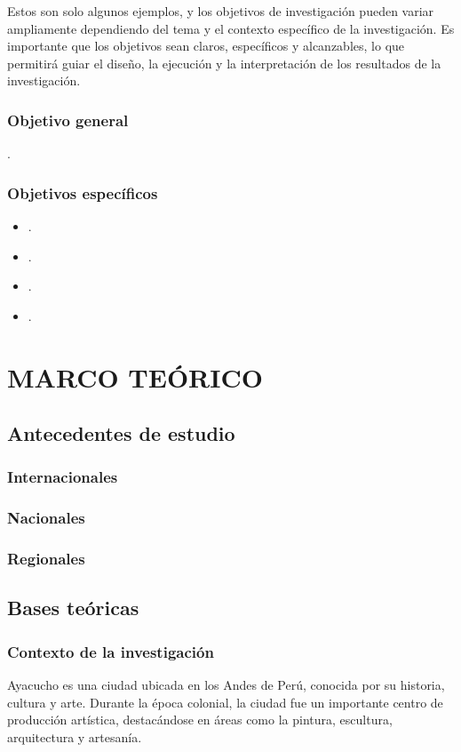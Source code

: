 \documentclass[12pt,a4paper]{article}
\begin{document}
Estos son solo algunos ejemplos, y los objetivos de investigación pueden variar ampliamente dependiendo del tema y el contexto específico de la investigación. Es importante que los objetivos sean claros, específicos y alcanzables, lo que permitirá guiar el diseño, la ejecución y la interpretación de los resultados de la investigación. 

\subsubsection{Objetivo general}
\objetivo.
\subsubsection{Objetivos específicos}
\begin{itemize}
	\item \objetivoe.
	\item \objetivoee.
	\item \objetivoeee.
	\item \objetivoeeee.
\end{itemize}


\section{MARCO TEÓRICO}

\subsection{Antecedentes de estudio}
\subsubsection{Internacionales}
\subsubsection{Nacionales}
\subsubsection{Regionales}

\subsection{Bases teóricas}
\subsubsection{Contexto de la investigación}
Ayacucho es una ciudad ubicada en los Andes de Perú, conocida por su historia, cultura y arte. Durante la época colonial, la ciudad fue un importante centro de producción artística, destacándose en áreas como la pintura, escultura, arquitectura y artesanía.
\end{document}
